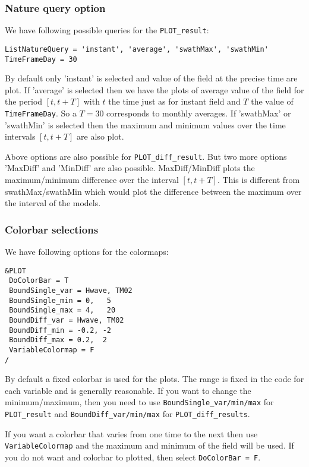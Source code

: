 \documentclass[12pt]{amsart}
\begin{document}
\subsubsection{Nature query option}\label{NatureQuery}
We have following possible queries for the {\tt PLOT\_result}:
\begin{verbatim}
ListNatureQuery = 'instant', 'average', 'swathMax', 'swathMin'
TimeFrameDay = 30
\end{verbatim}
By default only 'instant' is selected and value of the field at the precise time are plot.
If 'average' is selected then we have the plots of average value of the field for the period $[t, t+ T]$ with $t$ the time just as for instant field and $T$ the value of {\tt TimeFrameDay}. So a $T=30$ corresponds to monthly averages.
If 'swathMax' or 'swathMin' is selected then the maximum and minimum values over the time intervals $[t, t+T]$ are also plot.

Above options are also possible for {\tt PLOT\_diff\_result}. But two more options 'MaxDiff' and 'MinDiff' are also possible. MaxDiff/MinDiff plots the maximum/minimum difference over the interval $[t, t+T]$. This is different from swathMax/swathMin which would plot the difference between the maximum over the interval of the models.

\subsubsection{Colorbar selections}
We have following options for the colormaps:
\begin{verbatim}
&PLOT
 DoColorBar = T
 BoundSingle_var = Hwave, TM02
 BoundSingle_min = 0,   5
 BoundSingle_max = 4,   20
 BoundDiff_var = Hwave, TM02
 BoundDiff_min = -0.2, -2
 BoundDiff_max = 0.2,  2
 VariableColormap = F
/
\end{verbatim}
By default a fixed colorbar is used for the plots. The range is fixed in the code for each variable and is generally reasonable. If you want to change the minimum/maximum, then you need to use {\tt BoundSingle\_var/min/max} for {\tt PLOT\_result} and {\tt BoundDiff\_var/min/max} for {\tt PLOT\_diff\_results}.

If you want a colorbar that varies from one time to the next then use {\tt VariableColormap} and the maximum and minimum of the field will be used. If you do not want and colorbar to plotted, then select {\tt DoColorBar = F}.
\end{document}

